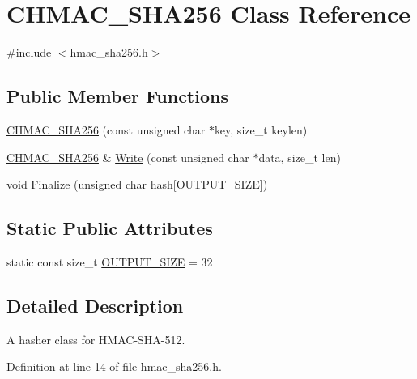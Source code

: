 \hypertarget{class_c_h_m_a_c___s_h_a256}{}\section{C\+H\+M\+A\+C\+\_\+\+S\+H\+A256 Class Reference}
\label{class_c_h_m_a_c___s_h_a256}


{\ttfamily \#include $<$hmac\+\_\+sha256.\+h$>$}

\subsection*{Public Member Functions}
\begin{DoxyCompactItemize}
\item 
\hyperlink{class_c_h_m_a_c___s_h_a256_a63236821773ad9edb3fba4623eef39b2}{C\+H\+M\+A\+C\+\_\+\+S\+H\+A256} (const unsigned char $\ast$key, size\+\_\+t keylen)
\item 
\hyperlink{class_c_h_m_a_c___s_h_a256}{C\+H\+M\+A\+C\+\_\+\+S\+H\+A256} \& \hyperlink{class_c_h_m_a_c___s_h_a256_a24ac9cf00e60d8028ab79df4aed984ff}{Write} (const unsigned char $\ast$data, size\+\_\+t len)
\item 
void \hyperlink{class_c_h_m_a_c___s_h_a256_a1cc600fd485b79dc52e11b12635c6dbe}{Finalize} (unsigned char \hyperlink{cache_8cc_a11ecb029164e055f28f4123ce3748862}{hash}\mbox{[}\hyperlink{class_c_h_m_a_c___s_h_a256_a6c94951e3698ec9bd4af95a1b9f9a2bb}{O\+U\+T\+P\+U\+T\+\_\+\+S\+I\+Z\+E}\mbox{]})
\end{DoxyCompactItemize}
\subsection*{Static Public Attributes}
\begin{DoxyCompactItemize}
\item 
static const size\+\_\+t \hyperlink{class_c_h_m_a_c___s_h_a256_a6c94951e3698ec9bd4af95a1b9f9a2bb}{O\+U\+T\+P\+U\+T\+\_\+\+S\+I\+Z\+E} = 32
\end{DoxyCompactItemize}


\subsection{Detailed Description}
A hasher class for H\+M\+A\+C-\/\+S\+H\+A-\/512. 

Definition at line 14 of file hmac\+\_\+sha256.\+h.



